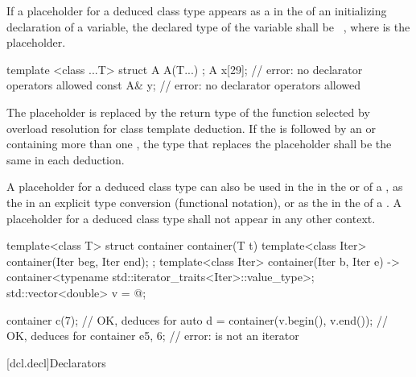 \pnum
If a placeholder for a deduced class type
appears as a 
in the 
of an initializing declaration of a variable,
the declared type of the variable shall be \cv{}~,
where  is the placeholder.
\begin{example}
\begin{codeblock}
template <class ...T> struct A {
  A(T...) {}
};
A x[29]{};          // error: no declarator operators allowed
const A& y{};       // error: no declarator operators allowed
\end{codeblock}
\end{example}
The placeholder is replaced by the return type
of the function selected by overload resolution
for class template deduction.
If the 
is followed by an 
or 
containing more than one ,
the type that replaces the placeholder shall be the same in each deduction.

\pnum
A placeholder for a deduced class type
can also be used
in the 
in the  or 
of a ,
as the 
in an explicit type conversion (functional notation),
or
as the  in the 
of a .
A placeholder for a deduced class type
shall not appear in any other context.

\pnum
\begin{example}
\begin{codeblock}
template<class T> struct container {
    container(T t) {}
    template<class Iter> container(Iter beg, Iter end);
};
template<class Iter>
container(Iter b, Iter e) -> container<typename std::iterator_traits<Iter>::value_type>;
std::vector<double> v = { @\commentellip@ };

container c(7);                         // OK, deduces  for 
auto d = container(v.begin(), v.end()); // OK, deduces  for 
container e{5, 6};                      // error:  is not an iterator
\end{codeblock}
\end{example}
%

[dcl.decl]{Declarators}%

